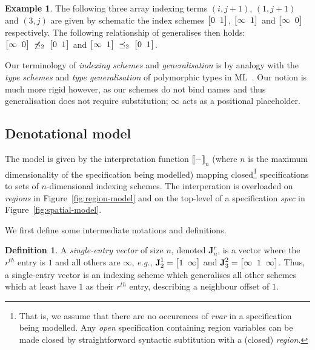 \documentclass[9pt]{sigplanconf}
\newcounter{block}
\theoremstyle{definition}
\newtheorem{example}[block]{Example}
\newtheorem{definition}[block]{Definition}
\newcommand{\eg}{\emph{e.g.}}
\newcommand{\interp}[1]{\llbracket{#1}\rrbracket}
\newcommand{\vtwoh}[2]{\setlength{\arraycolsep}{0em}
\left[\begin{array}{cc}#1 \; & \; #2\end{array}\right]}
\newcommand{\vthreeh}[3]{\setlength{\arraycolsep}{0em}
\left[\begin{array}{ccc}#1 \; & \; #2 \; & \; #3\end{array}\right]}
\newcommand{\singleEntry}[2]{\textbf{J}_{#2}^{#1}}
\begin{document}

\begin{example}
The following three array indexing terms
$(i, j+1)$, $(1, j+1)$ and $(3, j)$ 
are given by \textsf{schematic} the 
index schemes $\vtwoh{0}{1}$, $\vtwoh{\infty}{1}$
and $\vtwoh{\infty}{0}$ respectively. The following
relationship of generalises then holds:
$\vtwoh{\infty}{0} \; \not\preceq_2 \; \vtwoh{0}{1}$
and
$\vtwoh{\infty}{1} \; \preceq_2 \; \vtwoh{0}{1}$. 
\end{example}
\noindent
Our terminology of \emph{indexing schemes} and
\emph{generalisation} is by analogy
with the \emph{type schemes} and \emph{type generalisation} of
polymorphic types in ML~\cite{milner1978theory}. Our notion is
much more rigid however, as our schemes do not bind names
and thus generalisation does not require substitution; $\infty$ acts
as a positional placeholder.

\subsection{Denotational model}
\label{subsec:model}

The model is given by the interpretation function $\interp{-}_n$
(where $n$ is the maximum dimensionality of the specification being
modelled) mapping closed\footnote{That is, we assume that there are no
  occurences of \textit{rvar} in a specification being modelled.  Any
  \emph{open} specification containing region variables can be made
  closed by straightforward syntactic subtitution with a (closed)
  \textit{region}.} specifications to sets of
$n$-dimensional indexing schemes. The interperation is overloaded on
\emph{regions} in Figure~\ref{fig:region-model} and on the top-level
of a specification \textit{spec} in Figure~\ref{fig:spatial-model}.

We first define some intermediate notations and definitions.

\begin{definition}A \emph{single-entry vector} of size $n$, denoted
$\singleEntry{r}{n}$, is a vector where the $r^{th}$ entry is $1$
and all others are $\infty$, \eg{}, $\singleEntry{1}{2} =
\vtwoh{1}{\infty}$ and $\singleEntry{2}{3} = \vthreeh{\infty}{1}{\infty}$.
Thus, a single-entry vector is an indexing scheme which generalises
all other schemes which at least have $1$ as their $r^{th}$ entry,
describing a neighbour offset of $1$.
\end{definition}
\end{document}
